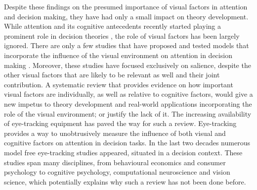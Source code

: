 \documentclass[english,natbib,man,floatsintext]{apa6}
\begin{document}
Despite these findings on the presumed importance of visual factors in attention and decision making, they have had only a small impact on theory development. While attention and its cognitive antecedents recently started playing a prominent role in decision theories \citep{callaway2019a, gluth2018, gluth2020, krajbich2010a, noguchi2018, thomas2019, usher2019}, the role of visual factors has been largely ignored. There are only a few studies that have proposed and tested models that incorporate the influence of the visual environment on attention in decision making \citep{chen2013, navalpakkam2010, towal2013a}. Moreover, these studies have focused exclusively on salience, despite the other visual factors that are likely to be relevant as well and their joint contribution. A systematic review that provides evidence on how important visual factors are individually, as well as relative to cognitive factors, would give a new impetus to theory development and real-world applications incorporating the role of the visual environment; or justify the lack of it. The increasing availability of eye-tracking equipment has paved the way for such a review. Eye-tracking provides a way to unobtrusively measure the influence of both visual and cognitive factors on attention in decision tasks. In the last two decades numerous model free eye-tracking studies appeared, situated in a decision context. These studies span many disciplines, from behavioural economics and consumer psychology to cognitive psychology, computational neuroscience and vision science, which potentially explains why such a review has not been done before.\\

\end{document}
